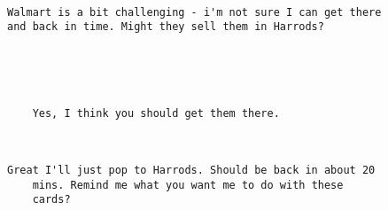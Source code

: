 \documentclass[xcolor=table]{beamer}
\begin{document}
\begin{frame}[fragile]
\begin{small}
	\begin{verbatim}

Walmart is a bit challenging - i'm not sure I can get there
and back in time. Might they sell them in Harrods?


	\end{verbatim}
\end{small}
\end{frame}
 
\begin{frame}[fragile]
\begin{small}
	\begin{verbatim}

	Yes, I think you should get them there.

	\end{verbatim}
\end{small}
\end{frame}
\begin{frame}[fragile]
\begin{small}
	\begin{verbatim}


Great I'll just pop to Harrods. Should be back in about 20
	mins. Remind me what you want me to do with these
	cards? 

	\end{verbatim}
\end{small}
\end{frame}
\end{document}
